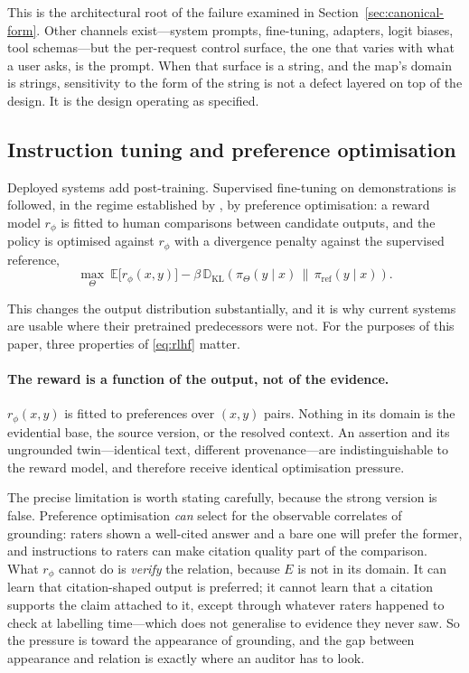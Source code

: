 This is the architectural root of the failure examined in
Section~\ref{sec:canonical-form}. Other channels exist---system prompts,
fine-tuning, adapters, logit biases, tool schemas---but the per-request control
surface, the one that varies with what a user asks, is the prompt. When that surface
is a string, and
the map's domain is strings, sensitivity to the form of the string is not a defect
layered on top of the design. It is the design operating as specified.

\subsection{Instruction tuning and preference optimisation}
\label{sec:rlhf}

Deployed systems add post-training. Supervised fine-tuning on demonstrations is
followed, in the regime established by \citet{ouyang2022}, by preference
optimisation: a reward model $r_\phi$ is fitted to human comparisons between
candidate outputs, and the policy is optimised against $r_\phi$ with a divergence
penalty against the supervised reference,
\begin{equation}
  \max_{\Theta}\ \mathbb{E}\bigl[r_\phi(x, y)\bigr]
  - \beta\, \mathbb{D}_{\mathrm{KL}}\!\left(\pi_\Theta(y \mid x)
    \,\|\, \pi_{\mathrm{ref}}(y \mid x)\right).
  \label{eq:rlhf}
\end{equation}

This changes the output distribution substantially, and it is why current systems
are usable where their pretrained predecessors were not. For the purposes of this
paper, three properties of \eqref{eq:rlhf} matter.

\paragraph{The reward is a function of the output, not of the evidence.}
$r_\phi(x, y)$ is fitted to preferences over $(x, y)$ pairs. Nothing in its domain
is the evidential base, the source version, or the resolved context. An assertion
and its ungrounded twin---identical text, different provenance---are
indistinguishable to the reward model, and therefore receive identical
optimisation pressure.

The precise limitation is worth stating carefully, because the strong version is
false. Preference optimisation \emph{can} select for the observable correlates of
grounding: raters shown a well-cited answer and a bare one will prefer the former,
and instructions to raters can make citation quality part of the comparison. What
$r_\phi$ cannot do is \emph{verify} the relation, because $E$ is not in its domain.
It can learn that citation-shaped output is preferred; it cannot learn that a
citation supports the claim attached to it, except through whatever raters happened
to check at labelling time---which does not generalise to evidence they never saw.
So the pressure is toward the appearance of grounding, and the gap between appearance
and relation is exactly where an auditor has to look.

